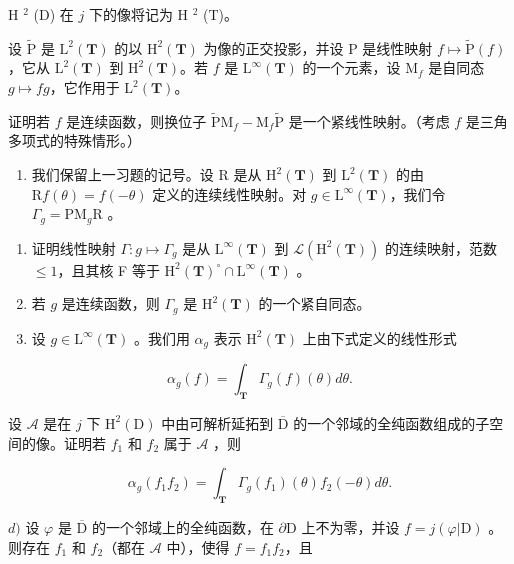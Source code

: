 H \(^{2}\) (D) 在 \(j\) 下的像将记为 H \(^{2}\) (T)。

设 \(\widetilde{\mathrm{P}}\) 是 \(\mathrm{L}^2 (\mathbf{T})\) 的以 \(\mathrm{H}^2 (\mathbf{T})\) 为像的正交投影，并设 P 是线性映射 \(f\mapsto \widetilde{\mathrm{P}} (f)\)，它从 \(\mathrm{L}^2 (\mathbf{T})\) 到 \(\mathrm{H}^2 (\mathbf{T})\)。若 \(f\) 是 \(\mathrm{L}^{\infty}(\mathbf{T})\) 的一个元素，设 \(\mathrm{M}_f\) 是自同态 \(g\mapsto fg\)，它作用于 \(\mathrm{L}^2 (\mathbf{T})\)。

证明若 \(f\) 是连续函数，则换位子 \(\widetilde{\mathrm{P}}\mathrm{M}_f - \mathrm{M}_f\widetilde{\mathrm{P}}\) 是一个紧线性映射。（考虑 \(f\) 是三角多项式的特殊情形。）

\begin{enumerate}
\def\labelenumi{\arabic{enumi})}
\setcounter{enumi}{21}
\tightlist
\item
  我们保留上一习题的记号。设 R 是从 \(\mathrm{H}^{2}(\mathbf{T})\) 到 \(\mathrm{L}^{2}(\mathbf{T})\) 的由 \(\mathrm{R}f(\theta)=f(-\theta)\) 定义的连续线性映射。对 \(g\in\mathrm{L}^{\infty}(\mathbf{T})\)，我们令 \(\Gamma_{g}=\mathrm{PM}_{g}\mathrm{R}\) 。
\end{enumerate}

\begin{enumerate}
\def\labelenumi{\alph{enumi})}
\item
  证明线性映射 \(\Gamma\colon g\mapsto\Gamma_{g}\) 是从 \(\mathrm{L}^{\infty}(\mathbf{T})\) 到 \(\mathcal{L}(\mathrm{H}^{2}(\mathbf{T}))\) 的连续映射，范数 \(\leqslant 1\)，且其核 F 等于 \(\mathrm{H}^{2}(\mathbf{T})^{\circ}\cap\mathrm{L}^{\infty}(\mathbf{T})\) 。
\item
  若 \(g\) 是连续函数，则 \(\Gamma_g\) 是 \(\mathrm{H}^2 (\mathbf{T})\) 的一个紧自同态。
\item
  设 \(g \in \mathrm{L}^{\infty}(\mathbf{T})\) 。我们用 \(\alpha_{g}\) 表示 \(\mathrm{H}^{2}(\mathbf{T})\) 上由下式定义的线性形式
\end{enumerate}

\[
\alpha_ {g} (f) = \int_ {\mathbf {T}} \Gamma_ {g} (f) (\theta) d \theta .
\]

设 \(\mathcal{A}\) 是在 \(j\) 下 \(\mathrm{H}^2 (\mathrm{D})\) 中由可解析延拓到 \(\overline{\mathrm{D}}\) 的一个邻域的全纯函数组成的子空间的像。证明若 \(f_{1}\) 和 \(f_{2}\) 属于 \(\mathcal{A}\) ，则

\[
\alpha_ {g} (f _ {1} f _ {2}) = \int_ {\mathbf {T}} \Gamma_ {g} (f _ {1}) (\theta) f _ {2} (- \theta) d \theta .
\]

\(d)\) 设 \(\varphi\) 是 \(\overline{\mathrm{D}}\) 的一个邻域上的全纯函数，在 \(\partial\mathrm{D}\) 上不为零，并设 \(f = j(\varphi|\mathrm{D})\) 。则存在 \(f_{1}\) 和 \(f_{2}\)（都在 \(\mathscr{A}\) 中），使得 \(f = f_{1}f_{2}\)，且

